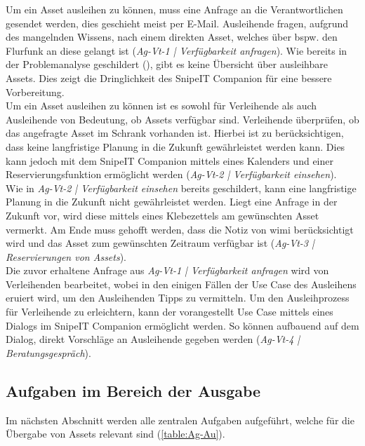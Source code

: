 Um ein Asset ausleihen zu können, muss eine Anfrage an die Verantwortlichen gesendet werden, dies
geschieht meist per E-Mail. Ausleihende fragen, aufgrund des mangelnden Wissens, nach einem direkten
Asset, welches über bspw. den Flurfunk an diese gelangt ist (\textit{Ag-Vt-1 | Verfügbarkeit
        anfragen}). Wie bereits in der Problemanalyse geschildert (),
gibt es keine Übersicht über ausleihbare Assets. Dies zeigt die Dringlichkeit des SnipeIT Companion
für eine bessere Vorbereitung.\\
Um ein Asset ausleihen zu können ist es sowohl für Verleihende als auch Ausleihende von Bedeutung,
ob Assets verfügbar sind. Verleihende überprüfen, ob das angefragte Asset im Schrank vorhanden ist.
Hierbei ist zu berücksichtigen, dass keine langfristige Planung in die Zukunft gewährleistet werden
kann. Dies kann jedoch mit dem SnipeIT Companion mittels eines Kalenders und einer
Reservierungsfunktion ermöglicht werden (\textit{Ag-Vt-2 | Verfügbarkeit einsehen}).\\
Wie in \textit{Ag-Vt-2 | Verfügbarkeit einsehen} bereits geschildert, kann eine langfristige Planung
in die Zukunft nicht gewährleistet werden. Liegt eine Anfrage in der Zukunft vor, wird diese mittels
eines Klebezettels am gewünschten Asset vermerkt. Am Ende muss gehofft werden, dass die Notiz von
\ac{wimi} berücksichtigt wird und das Asset zum gewünschten Zeitraum verfügbar ist (\textit{Ag-Vt-3
        | Reservierungen von Assets}). \\
Die zuvor erhaltene Anfrage aus \textit{Ag-Vt-1 | Verfügbarkeit anfragen} wird von Verleihenden
bearbeitet, wobei in den einigen Fällen der Use Case des Ausleihens eruiert wird, um den
Ausleihenden Tipps zu vermitteln. Um den Ausleihprozess für Verleihende zu erleichtern, kann der
vorangestellt Use Case mittels eines Dialogs im SnipeIT Companion ermöglicht werden. So können
aufbauend auf dem Dialog, direkt Vorschläge an Ausleihende gegeben werden (\textit{Ag-Vt-4 |
        Beratungsgespräch}).


\subsection{Aufgaben im Bereich der Ausgabe}
Im nächsten Abschnitt werden alle zentralen Aufgaben aufgeführt, welche für die Übergabe von
Assets relevant sind (\ref{table:Ag-Au}).

